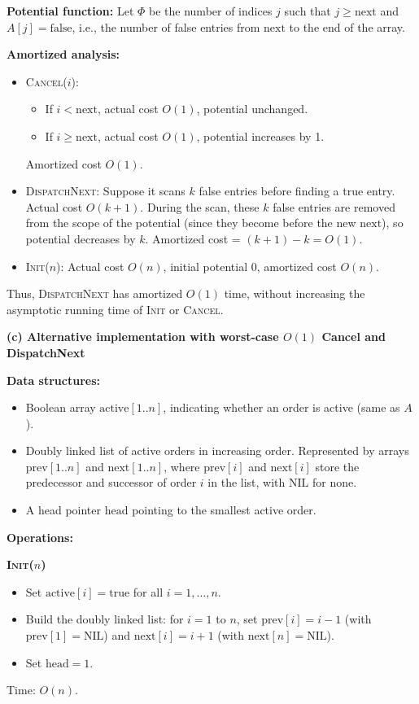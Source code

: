 \noindent \textbf{Potential function:} Let $\Phi$ be the number of indices $j$ such that $j \geq \text{next}$ and $A[j] = \text{false}$, i.e., the number of false entries from $\text{next}$ to the end of the array.

\noindent \textbf{Amortized analysis:}
\begin{itemize}
    \item \textsc{Cancel($i$)}: 
        \begin{itemize}
            \item If $i < \text{next}$, actual cost $O(1)$, potential unchanged.
            \item If $i \geq \text{next}$, actual cost $O(1)$, potential increases by 1.
        \end{itemize}
        Amortized cost $O(1)$.
    \item \textsc{DispatchNext}: Suppose it scans $k$ false entries before finding a true entry. Actual cost $O(k+1)$. During the scan, these $k$ false entries are removed from the scope of the potential (since they become before the new $\text{next}$), so potential decreases by $k$. Amortized cost = $(k+1) - k = O(1)$.
    \item \textsc{Init($n$)}: Actual cost $O(n)$, initial potential 0, amortized cost $O(n)$.
\end{itemize}

Thus, \textsc{DispatchNext} has amortized $O(1)$ time, without increasing the asymptotic running time of \textsc{Init} or \textsc{Cancel}.

\textbf{(c) Alternative implementation with worst-case $O(1)$ Cancel and DispatchNext}

\textbf{Data structures:}
\begin{itemize}
    \item Boolean array $\text{active}[1..n]$, indicating whether an order is active (same as $A$).
    \item Doubly linked list of active orders in increasing order. Represented by arrays $\text{prev}[1..n]$ and $\text{next}[1..n]$, where $\text{prev}[i]$ and $\text{next}[i]$ store the predecessor and successor of order $i$ in the list, with $\text{NIL}$ for none. 
    \item A head pointer $\text{head}$ pointing to the smallest active order.
\end{itemize}

\textbf{Operations:}

\noindent \textbf{\textsc{Init($n$)}}
\begin{itemize}
    \item Set $\text{active}[i] = \text{true}$ for all $i = 1, \dots, n$.
    \item Build the doubly linked list: for $i=1$ to $n$, set $\text{prev}[i] = i-1$ (with $\text{prev}[1] = \text{NIL}$) and $\text{next}[i] = i+1$ (with $\text{next}[n] = \text{NIL}$).
    \item Set $\text{head} = 1$.
\end{itemize}
        Time: $O(n)$.

